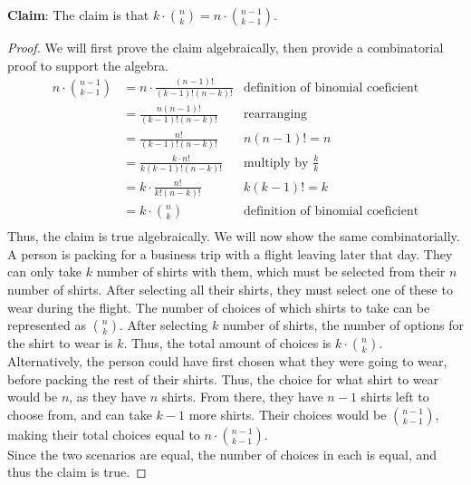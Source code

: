 \documentclass[titlepage]{article}
\begin{document}
\textbf{Claim}: The claim is that $k \cdot {{n}\choose{k}} = n \cdot {{n-1}\choose{k-1}}$. 
\begin{proof} We will first prove the claim algebraically, then provide a combinatorial proof to support the algebra.
\begin{align*}
n \cdot {{n-1}\choose{k-1}} &= n \cdot \frac{(n-1)!}{(k-1)!(n-k)!} & \text{definition of binomial coeficient} \\
&= \frac{n(n-1)!}{(k-1)!(n-k)!} & \text{rearranging} \\
&= \frac{n!}{(k-1)!(n-k)!} & n(n-1)! = n \\
&= \frac{k \cdot n!}{k(k-1)!(n-k)!} & \text{multiply by $\frac{k}{k}$} \\
&= k \cdot \frac{n!}{k!(n-k)!} & k(k-1)! = k \\
&= k \cdot {{n}\choose{k}} & \text{definition of binomial coeficient} \\
\end{align*}
Thus, the claim is true algebraically. We will now show the same combinatorially. \\
A person is packing for a business trip with a flight leaving later that day. They can only take $k$ number of shirts with them, which must be selected from their $n$ number of shirts. After selecting all their shirts, they must select one of these to wear during the flight. The number of choices of which shirts to take can be represented as ${n}\choose{k}$. After selecting $k$ number of shirts, the number of options for the shirt to wear is $k$. Thus, the total amount of choices is $k \cdot {{n}\choose{k}}$.\\
Alternatively, the person could have first chosen what they were going to wear, before packing the rest of their shirts. Thus, the choice for what shirt to wear would be $n$, as they have $n$ shirts. From there, they have $n-1$ shirts left to choose from, and can take $k-1$ more shirts. Their choices would be ${n-1}\choose{k-1}$, making their total choices equal to $n \cdot {{n-1}\choose{k-1}}$. \\
Since the two scenarios are equal, the number of choices in each is equal, and thus the claim is true.
\end{proof}
\end{document}
